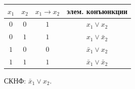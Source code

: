 \documentclass[a5paper, 11pt]{extarticle}
\theoremstyle{definition}
\theoremstyle{definition}
\theoremstyle{definition}
\numberwithin{figure}{section}
\numberwithin{table}{section}
\begin{document}
\begin{table}[H]
    \renewcommand{\arraystretch}{1.5}
    \begin{longtable}{|c|c|c|c|}
        \hline
        \(x_1\) & \(x_2\) & \(x_1 \to x_2\) & элем. конъюнкции             \\
        \hline
        \(0\)   & \(0\)   & \(1\)           & \(x_1 \lor x_2\)             \\
        \hline
        \(0\)   & \(1\)   & \(1\)           & \(x_1 \lor \bar{x}_2\)       \\
        \hline
        \(1\)   & \(0\)   & \(0\)           & \(\bar{x}_1 \lor x_2\)       \\
        \hline
        \(1\)   & \(1\)   & \(1\)           & \(\bar{x}_1 \lor \bar{x}_2\) \\
        \hline
    \end{longtable}
\end{table}

СКНФ: \(\bar{x}_1 \lor x_2\).
\end{document}
